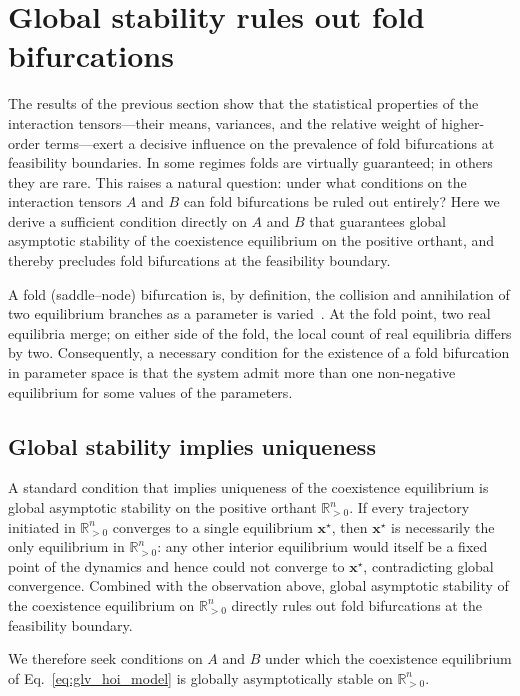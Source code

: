 \documentclass[pdflatex,sn-mathphys-num]{sn-jnl}%
\begin{document}
\section{Global stability rules out fold bifurcations}\label{sec:uniqueness}

The results of the previous section show that the statistical properties of the interaction tensors---their means, variances, and the relative weight of higher-order terms---exert a decisive influence on the prevalence of fold bifurcations at feasibility boundaries. In some regimes folds are virtually guaranteed; in others they are rare. This raises a natural question: under what conditions on the interaction tensors $A$ and $B$ can fold bifurcations be ruled out entirely? Here we derive a sufficient condition directly on $A$ and $B$ that guarantees global asymptotic stability of the coexistence equilibrium on the positive orthant, and thereby precludes fold bifurcations at the feasibility boundary.

A fold (saddle--node) bifurcation is, by definition, the collision and annihilation of two equilibrium branches as a parameter is varied~\cite{kuznetsov_elements_2004}. At the fold point, two real equilibria merge; on either side of the fold, the local count of real equilibria differs by two. Consequently, a necessary condition for the existence of a fold bifurcation in parameter space is that the system admit more than one non-negative equilibrium for some values of the parameters.

\subsection{Global stability implies uniqueness}

A standard condition that implies uniqueness of the coexistence equilibrium is global asymptotic stability on the positive orthant $\mathbb{R}^n_{>0}$. If every trajectory initiated in $\mathbb{R}^n_{>0}$ converges to a single equilibrium $\mathbf{x}^\star$, then $\mathbf{x}^\star$ is necessarily the only equilibrium in $\mathbb{R}^n_{>0}$: any other interior equilibrium would itself be a fixed point of the dynamics and hence could not converge to $\mathbf{x}^\star$, contradicting global convergence. Combined with the observation above, global asymptotic stability of the coexistence equilibrium on $\mathbb{R}^n_{>0}$ directly rules out fold bifurcations at the feasibility boundary.

We therefore seek conditions on $A$ and $B$ under which the coexistence equilibrium of Eq.~\eqref{eq:glv_hoi_model} is globally asymptotically stable on $\mathbb{R}^n_{>0}$.
\end{document}
